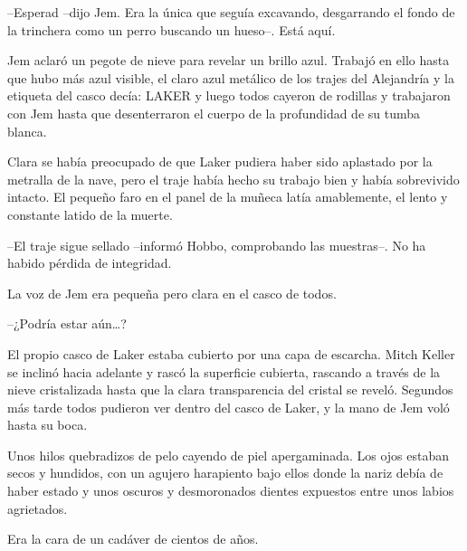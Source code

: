 {--Esperad --dijo Jem. Era la única que seguía excavando, desgarrando el
fondo de la trinchera como un perro buscando un hueso--. Está aquí.}

{Jem aclaró un pegote de nieve para revelar un brillo azul. Trabajó en
 ello hasta que hubo más azul visible, el claro azul metálico de los
 trajes del Alejandría y la etiqueta del casco decía: LAKER y luego todos
 cayeron de rodillas y trabajaron con Jem hasta que desenterraron el
cuerpo de la profundidad de su tumba blanca.}

{Clara se había preocupado de que Laker pudiera haber sido aplastado por
 la metralla de la nave, pero el traje había hecho su trabajo bien y
 había sobrevivido intacto. El pequeño faro en el panel de la muñeca
latía amablemente, el lento y constante latido de la muerte.}

{--El traje sigue sellado --informó Hobbo, comprobando las muestras--. No
ha habido pérdida de integridad.}

{La voz de Jem era pequeña pero clara en el casco de todos.}

{--¿Podría estar aún\ldots{}?}

{El propio casco de Laker estaba cubierto por una capa de escarcha. Mitch
 Keller se inclinó hacia adelante y rascó la superficie cubierta,
 rascando a través de la nieve cristalizada hasta que la clara
 transparencia del cristal se reveló. Segundos más tarde todos pudieron
ver dentro del casco de Laker, y la mano de Jem voló hasta su boca.}

{Unos hilos quebradizos de pelo cayendo de piel apergaminada. Los ojos
 estaban secos y hundidos, con un agujero harapiento bajo ellos donde la
 nariz debía de haber estado y unos oscuros y desmoronados dientes
expuestos entre unos labios agrietados.}

{Era la cara de un cadáver de cientos de años.}
